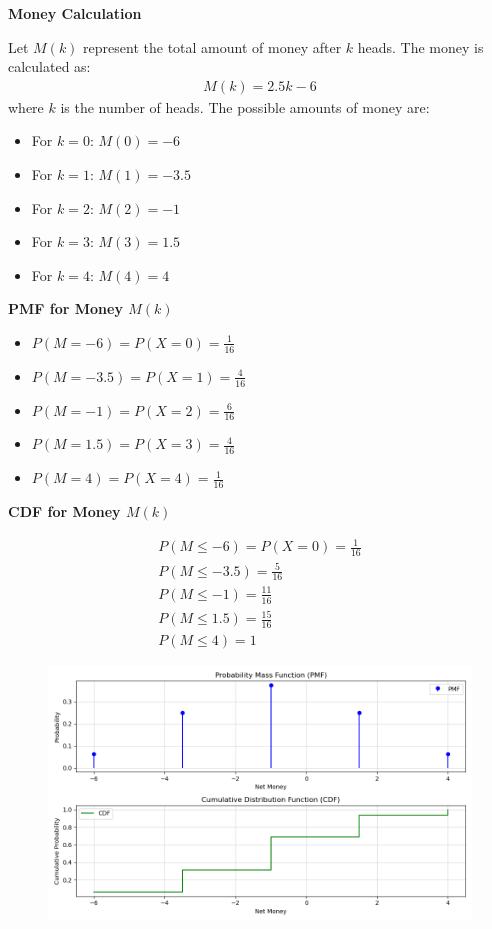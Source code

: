\documentclass[journal]{IEEEtran}
\numberwithin{equation}{enumi}
\numberwithin{figure}{enumi}
\begin{document}
\textbf{Money Calculation}

Let \( M(k) \) represent the total amount of money after \( k \) heads. The money is calculated as:
\begin{align}
M(k) = 2.5k - 6
\end{align}
where \( k \) is the number of heads. The possible amounts of money are:
\begin{itemize}
    \item For \( k = 0 \): \( M(0) = -6 \)
    \item For \( k = 1 \): \( M(1) = -3.5 \)
    \item For \( k = 2 \): \( M(2) = -1 \)
    \item For \( k = 3 \): \( M(3) = 1.5 \)
    \item For \( k = 4 \): \( M(4) = 4 \)
\end{itemize}
\textbf{PMF for Money \( M(k) \)}

\begin{itemize}
    \item \( P(M = -6) = P(X = 0) = \frac{1}{16} \)
    \item \( P(M = -3.5) = P(X = 1) = \frac{4}{16} \)
    \item \( P(M = -1) = P(X = 2) = \frac{6}{16} \)
    \item \( P(M = 1.5) = P(X = 3) = \frac{4}{16} \)
    \item \( P(M = 4) = P(X = 4) = \frac{1}{16} \)
\end{itemize}

 \textbf{CDF for Money \( M(k) \)}

\begin{align}
P(M \leq -6) = P(X = 0) = \frac{1}{16} \\
P(M \leq -3.5)   = \frac{5}{16}\\
P(M \leq -1)  = \frac{11}{16}\\
P(M \leq 1.5) =  \frac{15}{16}\\
P(M \leq 4)  = 1
\end{align}


\begin{figure}[h!]
   \centering
   \includegraphics[width=0.7\linewidth]{figs/Figure_1.png}
\end{figure}
\end{document}
